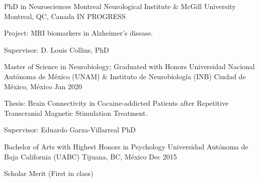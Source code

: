\begin{cventries}
    \cventry
        {PhD in Neurosciences}
        {Montreal Neurological Institute \& McGill University}
        {Montreal, QC, Canada}
        {IN PROGRESS}
        {
            \begin{cvitems}
                \item {Project: MRI biomarkers in Alzheimer's disease.}
                \item {Supervisor: D. Louis Collins, PhD}
            \end{cvitems}
        }
    \cventry
        {Master of Science in Neurobiology; Graduated with Honors}
        {Universidad Nacional Autónoma de México (UNAM) \& Instituto de
        Neurobiología (INB)}
        {Ciudad de México, México}
        {Jan 2020}
        {
            \begin{cvitems}
                \item {Thesis: Brain Connectivity in Cocaine-addicted Patients after Repetitive Transcranial Magnetic Stimulation Treatment.}
                \item {Supervisor: Eduardo Garza-Villarreal PhD}
            \end{cvitems}
        }
    \cventry
        {Bachelor of Arts with Highest Honors in Psychology}
        {Universidad Autónoma de Baja California (UABC)}
        {Tijuana, BC, México}
        {Dec 2015}
        {
            \begin{cvitems}
                \item {Scholar Merit (First in class)}
            \end{cvitems}
        }
\end{cventries}

